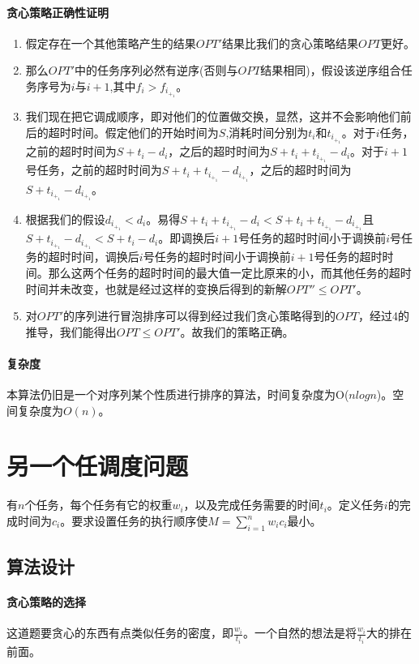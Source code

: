 \paragraph*{贪心策略正确性证明}
\begin{enumerate}
    \item 假定存在一个其他策略产生的结果$OPT'$结果比我们的贪心策略结果$OPT$更好。
    \item 那么$OPT'$中的任务序列必然有逆序(否则与$OPT$结果相同)，假设该逆序组合任务序号为$i$与$i+1$,其中$f_i>f_i_+_1$。
    \item 我们现在把它调成顺序，即对他们的位置做交换，显然，这并不会影响他们前后的超时时间。假定他们的开始时间为$S$,消耗时间分别为$t_i$和$t_i_+_1$。对于$i$任务，之前的超时时间为$S+t_i-d_i$，之后的超时时间为$S+t_i+t_i_+_1-d_i$。对于$i+1$号任务，之前的超时时间为$S+t_i+t_i_+_1-d_i_+_1$，之后的超时时间为$S+t_i_+_1-d_i_+_1$。
    \item 根据我们的假设$d_i_+_1<d_i$。易得$S+t_i+t_i_+_1-d_i<S+t_i+t_i_+_1-d_i_+_1$且$S+t_i_+_1-d_i_+_1<S+t_i-d_i$。即调换后$i+1$号任务的超时时间小于调换前$i$号任务的超时时间，调换后$i$号任务的超时时间小于调换前$i+1$号任务的超时时间。那么这两个任务的超时时间的最大值一定比原来的小，而其他任务的超时时间并未改变，也就是经过这样的变换后得到的新解$OPT'' \leq OPT'$。
    \item 对$OPT'$的序列进行冒泡排序可以得到经过我们贪心策略得到的$OPT$，经过4的推导，我们能得出$OPT \leq OPT'$。故我们的策略正确。
\end{enumerate}

\paragraph*{复杂度}
本算法仍旧是一个对序列某个性质进行排序的算法，时间复杂度为O($nlogn$)。空间复杂度为$O(n)$。

\section{另一个任调度问题}
\begin{example}
    有$n$个任务，每个任务有它的权重$w_i$，以及完成任务需要的时间$t_i$。定义任务$i$的完成时间为$c_i$。要求设置任务的执行顺序使$M = \sum_{i=1}^n w_ic_i$最小。
\end{example}

\subsection{算法设计}

\paragraph*{贪心策略的选择}
这道题要贪心的东西有点类似任务的密度，即$\frac{w_i}{t_i}$。一个自然的想法是将$\frac{w_i}{t_i}$大的排在前面。

